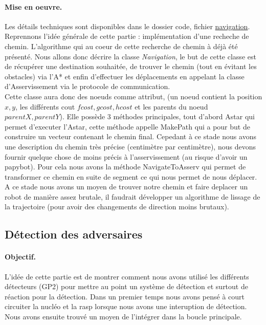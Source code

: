 \documentclass[a4paper,10pt]{report}
\begin{document}
\begin{spacing}{1.5}
\paragraph{Mise en oeuvre.} Les détails techniques sont disponibles dans le
dossier code, fichier
\href{https://github.com/eirbot/eirbot2020-1A/blob/master/code/src/navigation.cpp}{navigation}.
\\ Reprennons l'idée générale de cette partie : implémentation d'une recheche de
chemin. L'algorithme qui au coeur de cette recherche de chemin à déjà été
présenté. Nous allons donc décrire la classe \textit{Navigation}, le but de
cette classe est de récupérer une destination souhaitée, de trouver le chemin
(tout en évitant les obstacles) via l'A* et enfin d'effectuer les déplacements
en appelant la classe d'Asservissement via le protocole de
communication.\\ Cette classe aura donc des noeuds comme attribut, (un noeud
contient la position $x,y$, les différents cout $fcost, gcost, hcost$ et les
parents du noeud $parentX,parentY$). Elle possède 3 méthodes principales, tout
d'abord Astar qui permet d'executer l'Astar, cette méthode appelle MakePath qui
a pour but de construire un vecteur contenant le chemin final. Cepedant à ce
stade nous avons une description du chemin très précise (centimètre par
centimètre), nous devons fournir quelque chose de moins précis à
l'asservissement (au risque d'avoir un papybot). Pour cela nous avons la méthode
NavigateToAsserv qui permet de transformer ce chemin en suite de segment ce qui
nous permet de nous déplacer.\\ A ce stade nous avons un moyen de trouver notre
chemin et faire deplacer un robot de manière assez brutale, il faudrait
développer un algorithme de lissage de la trajectoire (pour avoir des
changements de direction moins brutaux).
\subsection{Détection des adversaires}
\paragraph{Objectif.} L'idée de cette partie est de montrer comment nous avons
utilisé les différents détecteurs (GP2) pour mettre au point un système de
détection et surtout de réaction pour la détection. Dans un premier temps nous
avons pensé à court circuiter la nucléo et la rasp lorsque nous avons une
interuption de détection. Nous avons ensuite trouvé un moyen de l'intégrer dans
la boucle principale.

\end{spacing}
\end{document}

